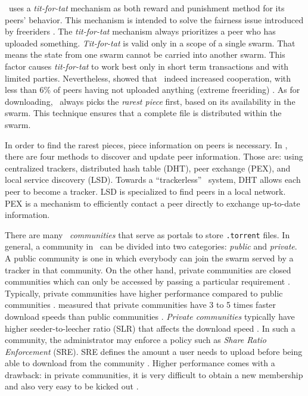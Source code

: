 \bt~uses a \textit{tit-for-tat} mechanism as both reward and punishment method for its peers' behavior. This mechanism is intended to solve the fairness issue introduced by freeriders \cite{2003:bittorrent:cohen}. The \textit{tit-for-tat} mechanism always prioritizes a peer who has uploaded something. \textit{Tit-for-tat} is valid only in a scope of a single swarm. That means the state from one swarm cannot be carried into another swarm. This factor causes \textit{tit-for-tat} to work best only in short term transactions and with limited parties. Nevertheless, \citeauthor{2005:bittorrentcooperation:andrade} showed that \bt~indeed increased cooperation, with less than 6\% of peers having not uploaded anything (extreme freeriding) \cite{2005:bittorrentcooperation:andrade}. As for downloading, \bt~always picks the \textit{rarest piece} first, based on its availability in the swarm. This technique ensures that a complete file is distributed within the swarm.

In order to find the rarest pieces, piece information on peers is necessary. In \bt, there are four methods to discover and update peer information. Those are: using centralized trackers, distributed hash table (DHT), peer exchange (PEX), and local service discovery (LSD). Towards a ``trackerless'' \bt~system, DHT allows each peer to become a tracker. LSD is specialized to find peers in a local network. PEX is a mechanism to efficiently contact a peer directly to exchange up-to-date information.

There are many \bt~\textit{communities} that serve as portals to store \texttt{.torrent} files. In general, a community in \bt~can be divided into two categories: \textit{public} and \textit{private}. A public community is one in which everybody can join the swarm served by a tracker in that community. On the other hand, private communities are closed communities which can only be accessed by passing a particular requirement \cite{2010:pubpriv:meulpolder, 2014:sustainabilitytorrent:chen}. Typically, private communities have higher performance compared to public communities \cite{2010:pubpriv:meulpolder}. \citeauthor{2010:pubpriv:meulpolder} measured that private communities have 3 to 5 times faster download speeds than public communities \cite{2010:pubpriv:meulpolder}. \textit{Private communities} typically have higher seeder-to-leecher ratio (SLR) that affects the download speed \cite{2005:bittorrentcooperation:andrade}. In such a community, the administrator may enforce a policy such as \textit{Share Ratio Enforcement} (SRE). SRE defines the amount a user needs to upload before being able to download from the community \cite{2012:economicbt:kash}. 
Higher performance comes with a drawback: in private communities, it is very difficult to obtain a new membership and also very easy to be kicked out \cite{2013:survivepriv:jia}.

